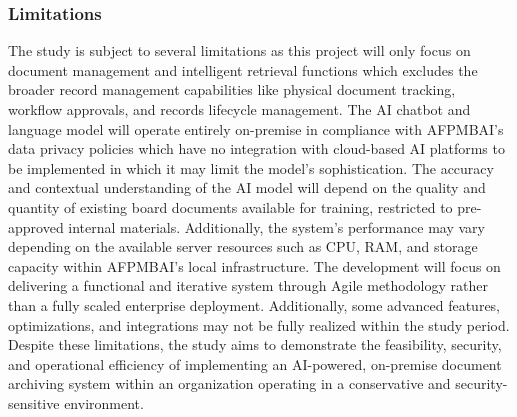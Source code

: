         \subsubsection{Limitations}  
            The study is subject to several limitations as this project will only focus on document management and intelligent retrieval functions which excludes the broader record management capabilities like physical document tracking, workflow approvals, and records lifecycle management. The AI chatbot and language model will operate entirely on-premise in compliance with AFPMBAI’s data privacy policies which have no integration with cloud-based AI platforms to be implemented in which it may limit the model’s sophistication. The accuracy and contextual understanding of the AI model will depend on the quality and quantity of existing board documents available for training, restricted to pre-approved internal materials. Additionally, the system’s performance may vary depending on the available server resources such as CPU, RAM, and storage capacity within AFPMBAI’s local infrastructure. The development will focus on delivering a functional and iterative system through Agile methodology rather than a fully scaled enterprise deployment. Additionally, some advanced features, optimizations, and integrations may not be fully realized within the study period. Despite these limitations, the study aims to demonstrate the feasibility, security, and operational efficiency of implementing an AI-powered, on-premise document archiving system within an organization operating in a conservative and security-sensitive environment. \\
            